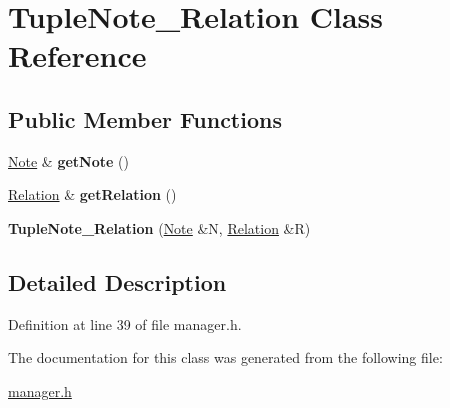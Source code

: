 \hypertarget{class_tuple_note___relation}{}\section{Tuple\+Note\+\_\+\+Relation Class Reference}
\label{class_tuple_note___relation}
\subsection*{Public Member Functions}
\begin{DoxyCompactItemize}
\item 
\mbox{\label{class_tuple_note___relation_a2bb8e84363d2bab8cd03742144a06ef9}} 
\hyperlink{class_note}{Note} \& {\bfseries get\+Note} ()
\item 
\mbox{\label{class_tuple_note___relation_a0e6d2fca79e715c85d4a4793da2bb381}} 
\hyperlink{class_relation}{Relation} \& {\bfseries get\+Relation} ()
\item 
\mbox{\label{class_tuple_note___relation_adc3d9a6e637361eedd2e561ae957e1fb}} 
{\bfseries Tuple\+Note\+\_\+\+Relation} (\hyperlink{class_note}{Note} \&N, \hyperlink{class_relation}{Relation} \&R)
\end{DoxyCompactItemize}


\subsection{Detailed Description}


Definition at line 39 of file manager.\+h.



The documentation for this class was generated from the following file\+:\begin{DoxyCompactItemize}
\item 
\hyperlink{manager_8h}{manager.\+h}\end{DoxyCompactItemize}
